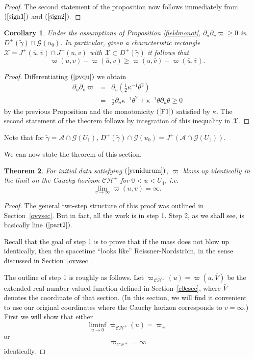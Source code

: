 \documentclass{article}
\newtheorem{theorem}{Theorem}[section]
\newtheorem{corollary}[theorem]{Corollary}
\begin{document}
{\begin{proof}
The second statement of the proposition now follows immediately
from $(\ref{sign1})$ and $(\ref{sign2})$.
\end{proof}

\begin{corollary}
\label{massmonot}
Under the assumptions of Proposition \ref{fieldmonot},
$\partial_u\partial_v\varpi\ge0$ in $D^+(\tilde\gamma)\cap\mathcal{G}(u_0)$.
In particular, given a characteristic rectangle 
$\mathcal{X}=J^+(\bar{u},\bar{v})\cap J^-(u,v)$ with $\mathcal{X}\subset
D^+(\tilde\gamma)$
it follows that
\[
\varpi(u,v)-\varpi(\bar{u},v)\ge\varpi(u,\bar{v})-\varpi(\bar{u},\bar{v}).
\]
\end{corollary}

\begin{proof} Differentiating $(\ref{pvqu})$ we obtain
\begin{eqnarray*}
\partial_u\partial_v\varpi&=&\partial_u\left(\frac12\kappa^{-1}
\theta^2\right)\\
&=&\frac12\partial_u\kappa^{-1}\theta^2
+\kappa^{-1}\theta\partial_u\theta\ge0
\end{eqnarray*}
by the previous Proposition and the monotonicity $(\ref{F1})$ satisfied
by $\kappa$.
The second statement of the theorem follows by integration of
this inequality in $\mathcal{X}$. \end{proof}

Note that for $\tilde\gamma=\mathcal{A}\cap\mathcal{G}(U_1)$,
$D^+(\tilde\gamma)\cap\mathcal{G}(u_0)=J^+(\mathcal{A}\cap\mathcal{G}(U_1))$.

We can now state the theorem of this section.
\begin{theorem}
For initial data satisfying $(\ref{yenidurum})$, $\varpi$
blows up identically in the limit on the Cauchy horizon $\mathcal{CH}^+$ for
$0<u<U_4$, 
i.e.
\[
\lim_{v\to\infty}\varpi(u,v)=\infty.
\]
\end{theorem}

\begin{proof} The general two-step structure
of this proof was outlined in Section~\ref{ovvsec}. But in fact,
all the work is in step 1. Step 2, as we shall see,
is basically line $(\ref{part2})$.

Recall that the goal of step 1 is to prove that
if the mass does not blow up identically, then the
spacetime ``looks like'' Reissner-Nordstr\"om, in the sense
discussed in Section~\ref{ovvsec}.

The outline of step 1 is roughly as follows.
Let $\varpi_{\mathcal{CH}^+}(u)=\varpi(u,\bar{V})$ be the extended
real number valued function defined in Section~\ref{c0esec}, where $\bar{V}$ denotes
the coordinate of that section. (In this section, we will find it convenient
to use our original coordinates where the Cauchy horizon corresponds
to $v=\infty$.)
First
we will show that either
\begin{equation}
\label{ya}
\liminf_{u\to0}\varpi_{\mathcal{CH}^+}(u)=\varpi_+
\end{equation}
or 
\begin{equation}
\label{ya2}
\varpi_{\mathcal{CH}^+}=\infty
\end{equation}
identically.


\end{proof}}
\end{document}
